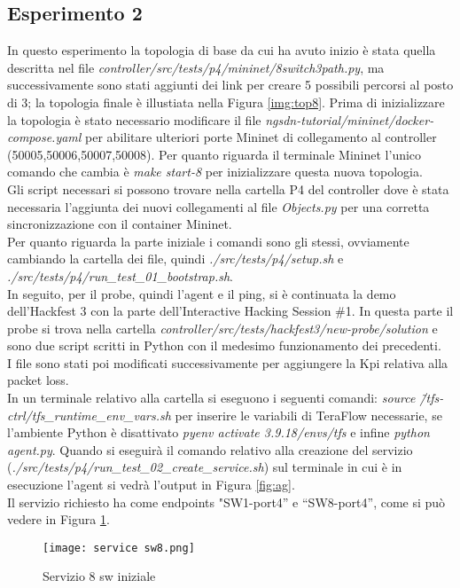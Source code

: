 \subsection{Esperimento 2}
In questo esperimento la topologia di base da cui ha avuto inizio è stata quella descritta nel file \textit{controller/src/tests/p4/mininet/8switch3path.py},
ma successivamente sono stati aggiunti dei link per creare 5 possibili percorsi al posto di 3; la topologia finale è illustiata nella Figura \ref{img:top8}. 
Prima di inizializzare la topologia è stato necessario modificare il file \textit{ngsdn-tutorial/mininet/docker-compose.yaml}
per abilitare ulteriori porte Mininet di collegamento al controller (50005,50006,50007,50008).
Per quanto riguarda il terminale Mininet l'unico comando che cambia è \textit{make start-8} per inizializzare questa nuova topologia.
\\Gli script necessari si possono trovare nella cartella P4 del controller \cite{ofc} dove è stata necessaria l'aggiunta dei nuovi collegamenti al file \textit{Objects.py} per una corretta sincronizzazione con il container Mininet.
\\Per quanto riguarda la parte iniziale i comandi sono gli stessi, ovviamente cambiando la cartella dei file, quindi \textit{./src/tests/p4/setup.sh} e \textit{./src/tests/p4/run\_test\_01\_bootstrap.sh}.
\\In seguito, per il probe, quindi l'agent e il ping, si è continuata la demo dell'Hackfest 3 con la parte dell'Interactive Hacking Session \#1.
In questa parte il probe si trova nella cartella \textit{controller/src/tests/hackfest3/new-probe/solution} e sono due script scritti in Python con il medesimo funzionamento dei precedenti.
\\I file sono stati poi modificati successivamente per aggiungere la Kpi relativa alla packet loss.
\\In un terminale relativo alla cartella si eseguono i seguenti comandi: \textit{source \~/tfs-ctrl/tfs\_runtime\_env\_vars.sh} per inserire le variabili di TeraFlow
necessarie, se l'ambiente Python è disattivato \textit{pyenv activate 3.9.18/envs/tfs} e infine \textit{python agent.py}.
Quando si eseguirà il comando relativo alla creazione del servizio (\textit{./src/tests/p4/run\_test\_02\_create\_service.sh}) 
sul terminale in cui è in esecuzione l'agent si vedrà l'output in Figura \ref{fig:ag}.
\\Il servizio richiesto ha come endpoints "SW1-port4” e “SW8-port4”, come si può vedere in Figura \ref{fig:sw8}.
\begin{figure}[h]
    \centering
   \texttt{[image: service sw8.png]}
    \caption{Servizio 8 sw iniziale}
    \label{fig:sw8}
\end{figure}
